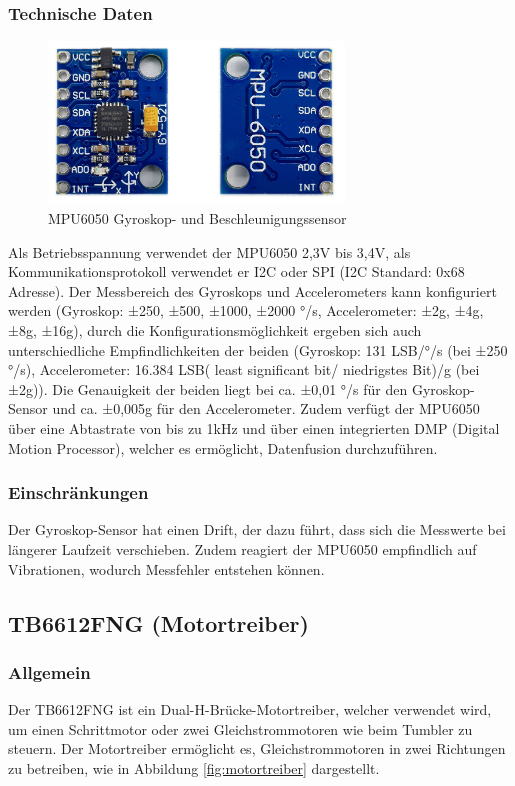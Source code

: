 \subsubsection{Technische Daten}
\begin{figure}[H]
    \centering
    \includegraphics[width=0.7\textwidth]{img/Hardware/MPU6050.png}
    \caption{MPU6050 Gyroskop- und Beschleunigungssensor}
    \label{fig:mpu6050}
\end{figure}
Als Betriebsspannung verwendet der MPU6050 2,3V bis 3,4V, als Kommunikationsprotokoll verwendet er I2C oder SPI (I2C Standard: 0x68 Adresse). 
Der Messbereich des Gyroskops und Accelerometers kann konfiguriert werden (Gyroskop:  ±250, ±500, ±1000, ±2000 °/s, Accelerometer: ±2g, ±4g, ±8g, ±16g), 
durch die Konfigurationsmöglichkeit ergeben sich auch unterschiedliche Empfindlichkeiten der beiden (Gyroskop: 131 LSB/°/s (bei ±250 °/s), 
Accelerometer: 16.384 LSB( least significant bit/ niedrigstes Bit)/g (bei ±2g)).  
Die Genauigkeit der beiden liegt bei ca. ±0,01 °/s für den Gyroskop-Sensor und ca. ±0,005g für den Accelerometer. 
Zudem verfügt der MPU6050 über eine Abtastrate von bis zu 1kHz und über einen integrierten DMP (Digital Motion Processor), welcher es ermöglicht, Datenfusion durchzuführen.
\subsubsection{Einschränkungen}
Der Gyroskop-Sensor hat einen Drift, der dazu führt, dass sich die Messwerte bei längerer Laufzeit verschieben. 
Zudem reagiert der MPU6050 empfindlich auf Vibrationen, wodurch Messfehler entstehen können.
%
\subsection{TB6612FNG (Motortreiber)}
%
\subsubsection{Allgemein}
Der TB6612FNG ist ein Dual-H-Brücke-Motortreiber, welcher verwendet wird, um einen Schrittmotor oder zwei Gleichstrommotoren wie beim Tumbler zu steuern. Der Motortreiber ermöglicht es, Gleichstrommotoren in zwei Richtungen zu betreiben, wie in Abbildung \ref{fig:motortreiber} dargestellt.
